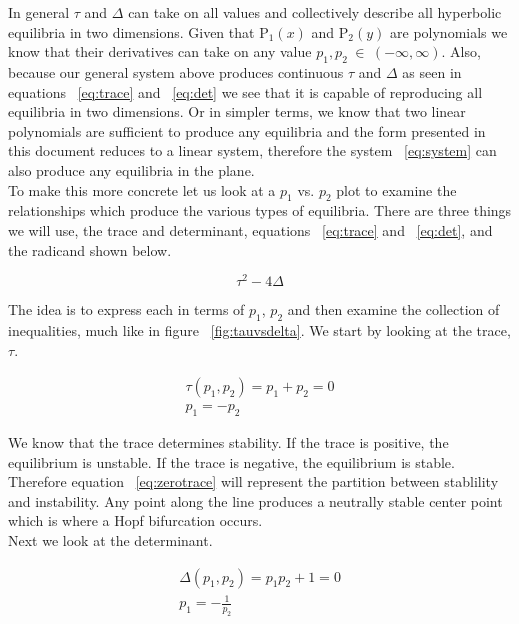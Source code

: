 \documentclass{article}
\begin{document}
In general $\tau$ and $\Delta$ can take on all values and collectively
describe all hyperbolic equilibria in two dimensions. Given that $\text{P}_1(x)$ and
$\text{P}_2(y)$ are polynomials we know that their derivatives can take on any
value $p_1,p_2 \hspace{3pt} \in \hspace{3pt} (-\infty,\infty)$. Also,
because our general system above produces continuous $\tau$ and
$\Delta$ as seen in equations ~\ref{eq:trace} and ~\ref{eq:det}  we see that it is capable of reproducing all equilibria in two
dimensions. Or in simpler terms, we know that two linear polynomials are sufficient to
produce any equilibria and the form presented in this document reduces to a
linear system, therefore the system ~\ref{eq:system} can also produce any
equilibria in the plane. \\

To make this more concrete let us look at a $p_1$ vs. $p_2$ plot to examine the relationships which
produce the various types of equilibria. There are three things we will use, the
trace and determinant, equations ~\ref{eq:trace} and ~\ref{eq:det}, and the radicand shown below.

\begin{equation}
    \tau^2-4\Delta \label{eq:radicand}
\end{equation}

\noindent The idea is to express each in terms of $p_1$, $p_2$ and then
examine the collection of inequalities, much like in figure ~\ref{fig:tauvsdelta}. We start by looking at the trace, $\tau$.

\begin{gather}
    \tau(p_1,p_2) = p_1+p_2 = 0 \nonumber \\
    p_1 = -p_2 \label{eq:zerotrace}
\end{gather}

\noindent We know that the trace determines stability. If the trace is 
positive, the equilibrium is unstable. If the trace is negative, the equilibrium
is stable. Therefore equation ~\ref{eq:zerotrace} will represent the partition
between stablility and instability. Any point along the line produces a
neutrally stable center point which is where a Hopf bifurcation occurs. \\

\noindent Next we look at the determinant. 

\begin{gather}
    \Delta(p_1,p_2) = p_1p_2+1 = 0 \nonumber \\
    p_1=-\frac{1}{p_2} \label{eq:zerodet}
\end{gather}
\end{document}
